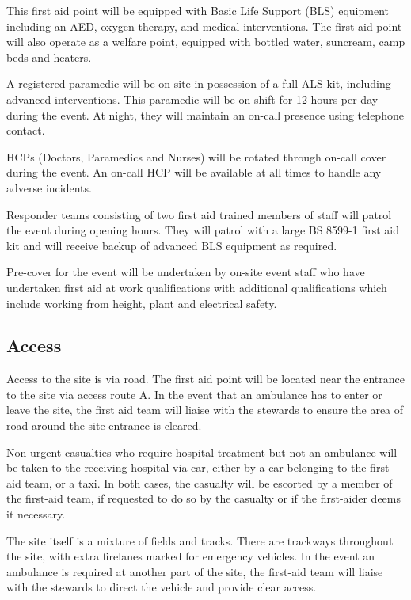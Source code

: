 This first aid point will be equipped with Basic Life Support (BLS) equipment including
an AED, oxygen therapy, and medical interventions. The first aid point will also operate as
a welfare point, equipped with bottled water, suncream, camp beds and heaters.

A registered paramedic will be on site in possession of a full ALS kit, including advanced
interventions. This paramedic will be on-shift for 12 hours per day during the event. At
night, they will maintain an on-call presence using telephone contact.

HCPs (Doctors, Paramedics and Nurses) will be rotated through on-call cover during the
event. An on-call HCP will be available at all times to handle any adverse incidents.

Responder teams consisting of two first aid trained members of staff will patrol the event
during opening hours. They will patrol with a large BS 8599-1 first aid kit and will receive
backup of advanced BLS equipment as required.

Pre-cover for the event will be undertaken by on-site event staff who have undertaken first aid
at work qualifications with additional qualifications which include working from height, plant
and electrical safety.

\subsection{Access}

Access to the site is via road. The first aid point will be located near the
entrance to the site via access route A. In the event that an ambulance has
to enter or leave the site, the first aid team will liaise with the stewards to ensure
the area of road around the site entrance is cleared.

Non-urgent casualties who require hospital treatment but not an ambulance will
be taken to the receiving hospital via car, either by a car belonging to the
first-aid team, or a taxi. In both cases, the casualty will be escorted by a
member of the first-aid team, if requested to do so by the casualty or if the
first-aider deems it necessary.

The site itself is a mixture of fields and tracks. There are
trackways throughout the site, with extra firelanes marked for emergency
vehicles. In the event an ambulance is required at another part of the site,
the first-aid team will liaise with the stewards to direct the vehicle and
provide clear access.

